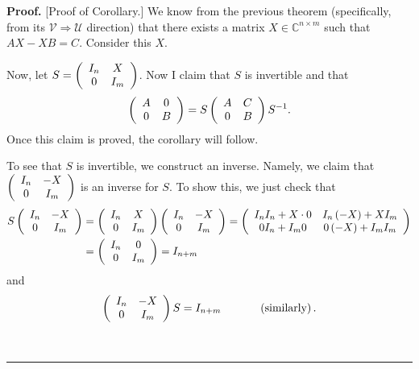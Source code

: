 \documentclass[numbers=enddot,12pt,final,onecolumn,notitlepage]{scrartcl}%
\numberwithin{exer}{subsection}
\theoremstyle{definition}
\newenvironment{proof}[1][Proof]{\noindent\textbf{#1.} }{\ \rule{0.5em}{0.5em}}
\begin{document}
\begin{proof}
[Proof of Corollary.] We know from the previous theorem (specifically, from
its $\mathcal{V}\Longrightarrow\mathcal{U}$ direction) that there exists a
matrix $X\in\mathbb{C}^{n\times m}$ such that $AX-XB=C$. Consider this $X$.

Now, let $S=\left(
\begin{array}
[c]{cc}%
I_{n} & X\\
0 & I_{m}%
\end{array}
\right)  $. Now I claim that $S$ is invertible and that%
\[
\left(
\begin{array}
[c]{cc}%
A & 0\\
0 & B
\end{array}
\right)  =S\left(
\begin{array}
[c]{cc}%
A & C\\
0 & B
\end{array}
\right)  S^{-1}.
\]
Once this claim is proved, the corollary will follow.

To see that $S$ is invertible, we construct an inverse. Namely, we claim that
$\left(
\begin{array}
[c]{cc}%
I_{n} & -X\\
0 & I_{m}%
\end{array}
\right)  $ is an inverse for $S$. To show this, we just check that%
\begin{align*}
S\left(
\begin{array}
[c]{cc}%
I_{n} & -X\\
0 & I_{m}%
\end{array}
\right)    & =\left(
\begin{array}
[c]{cc}%
I_{n} & X\\
0 & I_{m}%
\end{array}
\right)  \left(
\begin{array}
[c]{cc}%
I_{n} & -X\\
0 & I_{m}%
\end{array}
\right)  =\left(
\begin{array}
[c]{cc}%
I_{n}I_{n}+X\cdot0 & I_{n}\left(  -X\right)  +XI_{m}\\
0I_{n}+I_{m}0 & 0\left(  -X\right)  +I_{m}I_{m}%
\end{array}
\right)  \\
& =\left(
\begin{array}
[c]{cc}%
I_{n} & 0\\
0 & I_{m}%
\end{array}
\right)  =I_{n+m}%
\end{align*}
and%
\[
\left(
\begin{array}
[c]{cc}%
I_{n} & -X\\
0 & I_{m}%
\end{array}
\right)  S=I_{n+m}\ \ \ \ \ \ \ \ \ \ \left(  \text{similarly}\right)  .
\]



\end{proof}
\end{document}
